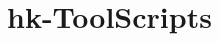 \chapter{hk-\/\+Tool\+Scripts}
\hypertarget{md_README}{}\label{md_README}
\label{md_README_autotoc_md0}%
%
